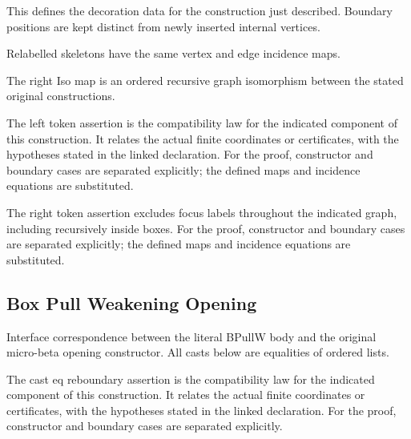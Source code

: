 This defines the decoration data for the construction just described. Boundary positions are kept distinct from newly inserted internal vertices.
\par{}

Relabelled skeletons have the same vertex and edge incidence maps.
\par{}

The right Iso map is an ordered recursive graph isomorphism between the stated original constructions.
\par{}

The left token assertion is the compatibility law for the indicated component of this construction. It relates the actual finite coordinates or certificates, with the hypotheses stated in the linked declaration.
For the proof, constructor and boundary cases are separated explicitly; the defined maps and incidence equations are substituted.
\par{}

The right token assertion excludes focus labels throughout the indicated graph, including recursively inside boxes.
For the proof, constructor and boundary cases are separated explicitly; the defined maps and incidence equations are substituted.
\par{}

\subsection{Box Pull Weakening Opening}
Interface correspondence between the literal BPullW body and the original micro-beta opening constructor. All casts below are equalities of ordered lists.

The cast eq reboundary assertion is the compatibility law for the indicated component of this construction. It relates the actual finite coordinates or certificates, with the hypotheses stated in the linked declaration.
For the proof, constructor and boundary cases are separated explicitly.
\par{}


